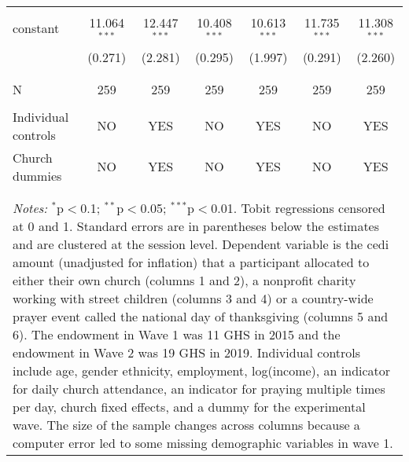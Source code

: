 \begin{table}[!htbp]
\begin{tabular}{@{\extracolsep{5pt}}lcccccc}
  & & & & & & \\ 
 constant & 11.064$^{***}$ & 12.447$^{***}$ & 10.408$^{***}$ & 10.613$^{***}$ & 11.735$^{***}$ & 11.308$^{***}$ \\ 
  & (0.271) & (2.281) & (0.295) & (1.997) & (0.291) & (2.260) \\ 
  & & & & & & \\ 
\cline{2-7} \\[-2.0ex]
N & 259 & 259 & 259 & 259 & 259 & 259 \\  \hline \\[-1.8ex] 
Individual controls & NO & YES & NO & YES & NO & YES \\ 
Church dummies & NO & YES & NO & YES & NO & YES \\ 
\\[-2.0ex]
\hline 
\hline \\[-1.8ex] 
\multicolumn{7}{l}{ \parbox[t]{0.95\linewidth}{\small{ \textit{Notes:} $^{*}$p$<$0.1; $^{**}$p$<$0.05; $^{***}$p$<$0.01}.  Tobit regressions censored at 0 and 1. Standard errors are in parentheses below the estimates and are clustered at the session level. Dependent variable is the cedi amount (unadjusted for inflation) that a participant allocated to either their own church (columns 1 and 2), a nonprofit charity working with street children (columns 3 and 4) or a country-wide prayer event called the national day of thanksgiving (columns 5 and 6). The endowment in Wave 1 was 11 GHS in 2015 and the endowment in Wave 2 was 19 GHS in 2019. Individual controls include age, gender ethnicity, employment, log(income), an indicator for daily church attendance, an indicator for praying multiple times per day, church fixed effects, and a dummy for the experimental wave. The size of the sample changes across columns because a computer error led to some missing demographic variables in wave 1. }}\\
\end{tabular} 
\end{table} 
